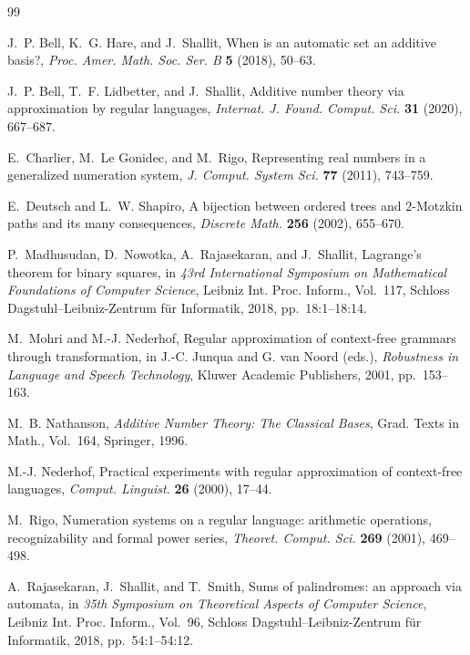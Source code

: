 \documentclass[11pt]{article}
\theoremstyle{plain}
\theoremstyle{definition}
\begin{document}
\begin{thebibliography}{99}

J.~P. Bell, K.~G. Hare, and J.~Shallit,
When is an automatic set an additive basis?,
\emph{Proc. Amer. Math. Soc. Ser. B} \textbf{5} (2018), 50--63.

J.~P. Bell, T.~F. Lidbetter, and J.~Shallit,
Additive number theory via approximation by regular languages,
\emph{Internat. J. Found. Comput. Sci.} \textbf{31} (2020), 667--687.

E.~Charlier, M.~Le Gonidec, and M.~Rigo,
Representing real numbers in a generalized numeration system,
\emph{J. Comput. System Sci.} \textbf{77} (2011), 743--759.

E.~Deutsch and L.~W. Shapiro,
A bijection between ordered trees and $2$-Motzkin paths and its many
consequences,
\emph{Discrete Math.} \textbf{256} (2002), 655--670.

P.~Madhusudan, D.~Nowotka, A.~Rajasekaran, and J.~Shallit,
Lagrange's theorem for binary squares,
in \emph{43rd International Symposium on Mathematical Foundations of
Computer Science}, Leibniz Int. Proc. Inform., Vol.~117, Schloss
Dagstuhl--Leibniz-Zentrum f{\"u}r Informatik, 2018, pp.~18:1--18:14.

M.~Mohri and M.-J. Nederhof,
Regular approximation of context-free grammars through transformation,
in J.-C. Junqua and G. van Noord (eds.),
\emph{Robustness in Language and Speech Technology},
Kluwer Academic Publishers, 2001, pp.~153--163.

M.~B. Nathanson,
\emph{Additive Number Theory: The Classical Bases},
Grad. Texts in Math., Vol.~164, Springer, 1996.

M.-J. Nederhof,
Practical experiments with regular approximation of context-free
languages,
\emph{Comput. Linguist.} \textbf{26} (2000), 17--44.

M.~Rigo,
Numeration systems on a regular language: arithmetic operations,
recognizability and formal power series,
\emph{Theoret. Comput. Sci.} \textbf{269} (2001), 469--498.

A.~Rajasekaran, J.~Shallit, and T.~Smith,
Sums of palindromes: an approach via automata,
in \emph{35th Symposium on Theoretical Aspects of Computer Science},
Leibniz Int. Proc. Inform., Vol.~96, Schloss
Dagstuhl--Leibniz-Zentrum f{\"u}r Informatik, 2018, pp.~54:1--54:12.

\end{thebibliography}
\end{document}
